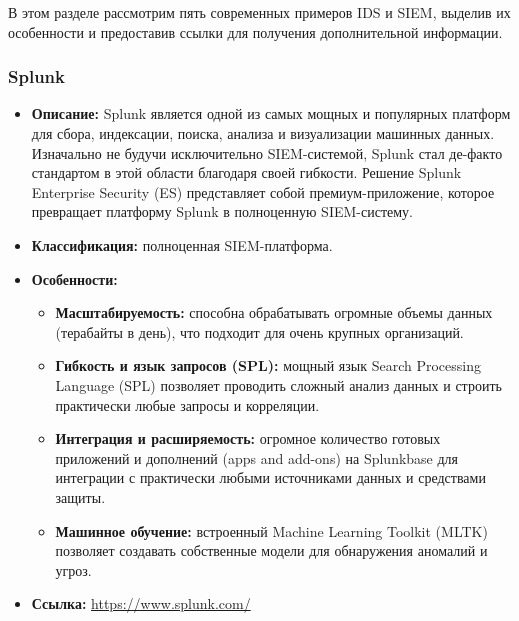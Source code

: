В этом разделе рассмотрим пять современных примеров IDS и SIEM, выделив их особенности и предоставив ссылки для получения дополнительной информации.

\subsubsection{Splunk}
\begin{itemize}
		\item \textbf{Описание:} Splunk является одной из самых мощных и популярных платформ для сбора, индексации, поиска, анализа и визуализации машинных данных. Изначально не будучи исключительно SIEM-системой, Splunk стал де-факто стандартом в этой области благодаря своей гибкости. Решение Splunk Enterprise Security (ES) представляет собой премиум-приложение, которое превращает платформу Splunk в полноценную SIEM-систему.
    \item \textbf{Классификация:} полноценная SIEM-платформа.
    \item \textbf{Особенности:}
    \begin{itemize}
        \item \textbf{Масштабируемость:} способна обрабатывать огромные объемы данных (терабайты в день), что подходит для очень крупных организаций.
        \item \textbf{Гибкость и язык запросов (SPL):} мощный язык Search Processing Language (SPL) позволяет проводить сложный анализ данных и строить практически любые запросы и корреляции.
        \item \textbf{Интеграция и расширяемость:} огромное количество готовых приложений и дополнений (apps and add-ons) на Splunkbase для интеграции с практически любыми источниками данных и средствами защиты.
        \item \textbf{Машинное обучение:} встроенный Machine Learning Toolkit (MLTK) позволяет создавать собственные модели для обнаружения аномалий и угроз.
    \end{itemize}
    \item \textbf{Ссылка:} \url{https://www.splunk.com/}
\end{itemize}


